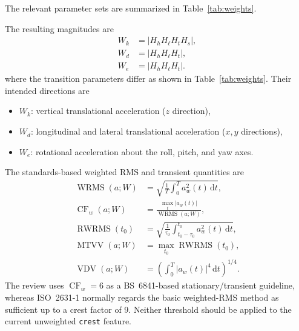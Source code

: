 \documentclass[letterpaper,journal]{IEEEtran}
\newcommand{\WRMS}{\operatorname{WRMS}}
\newcommand{\RWRMS}{\operatorname{RWRMS}}
\newcommand{\MTVV}{\operatorname{MTVV}}
\newcommand{\VDV}{\operatorname{VDV}}
\newcommand{\CF}{\operatorname{CF}}
\begin{document}
The relevant parameter sets are summarized in Table~\ref{tab:weights}.
\begin{table}[t]
\centering
\caption{ISO~2631-1 weighting parameters used by the current channels.}
\label{tab:weights}
\end{table}
The resulting magnitudes are
\begin{align*}
W_k &= |H_hH_\ell H_tH_s|,\\
W_d &= |H_hH_\ell H_t|,\\
W_e &= |H_hH_\ell H_t|.
\end{align*}
where the transition parameters differ as shown in Table~\ref{tab:weights}. Their intended
directions are
\begin{itemize}
\item $W_k$: vertical translational acceleration ($z$ direction),
\item $W_d$: longitudinal and lateral translational acceleration ($x,y$ directions),
\item $W_e$: rotational acceleration about the roll, pitch, and yaw axes.
\end{itemize}

The standards-based weighted RMS and transient quantities are
\begin{align*}
\WRMS(a;W) &= \sqrt{\frac{1}{T}\int_0^T a_w^2(t)\,\mathrm{d}t},\\
\CF_w(a;W) &= \frac{\max_t|a_w(t)|}{\WRMS(a;W)},\\
\RWRMS(t_0) &= \sqrt{\frac{1}{\tau_0}
\int_{t_0-\tau_0}^{t_0} a_w^2(t)\,\mathrm{d}t},\\
\MTVV(a;W) &= \max_{t_0}\RWRMS(t_0),\\
\VDV(a;W) &= \left(\int_0^T |a_w(t)|^4\,\mathrm{d}t\right)^{1/4}.
\end{align*}
The review uses $\CF_w=6$ as a BS~6841-based stationary/transient guideline, whereas
ISO~2631-1 normally regards the basic weighted-RMS method as sufficient up to a crest
factor of 9. Neither threshold should be applied to the current unweighted
\texttt{crest} feature.
\end{document}
